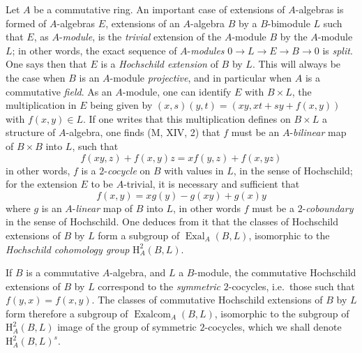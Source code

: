 \begin{env}[18.4.3]
\label{0.18.4.3}
Let $A$ be a commutative ring.
An important case of extensions of $A$-algebras is formed of $A$-algebras $E$, extensions of an $A$-algebra $B$ by a $B$-bimodule $L$ such that $E$, as $A$-\emph{module}, is the \emph{trivial} extension of the $A$-module $B$ by the $A$-module $L$; in other words, the exact sequence of $A$-\emph{modules} $0\to L\to E\to B\to 0$ is \emph{split}.
One says then that $E$ is a \emph{Hochschild extension} of $B$ by $L$.
This will always be the case when $B$ is an $A$-module \emph{projective}, and in particular when $A$ is a commutative \emph{field}.
As an $A$-module, one can identify $E$ with $B\times L$, the multiplication in $E$ being given by $(x,s)(y,t)=(xy,xt+sy+f(x,y))$ with $f(x,y)\in L$.
If one writes that this multiplication defines on $B\times L$ a structure of $A$-algebra, one finds (M, XIV, 2) that $f$ must be an $A$-\emph{bilinear} map of $B\times B$ into $L$, such that
\begin{equation}
\tag{18.4.3.1}
  \label{0.18.4.3.1}
  f(xy,z)+f(x,y)z=xf(y,z)+f(x,yz)
\end{equation}
in other words, $f$ is a $2$-\emph{cocycle} on $B$ with values in $L$, in the sense of Hochschild; for the extension $E$ to be $A$-trivial, it is necessary and sufficient that
\begin{equation}
\tag{18.4.3.2}
  \label{0.18.4.3.2}
  f(x,y)=xg(y)-g(xy)+g(x)y
\end{equation}
where $g$ is an $A$-\emph{linear} map of $B$ into $L$, in other words $f$ must be a $2$-\emph{coboundary} in the sense of Hochschild.
One deduces from it that the classes of Hochschild extensions of $B$ by $L$ form a subgroup of $\operatorname{Exal}_A(B,L)$, isomorphic to the \emph{Hochschild cohomology group} $\mathrm{H}^2_A(B,L)$.

If $B$ is a commutative $A$-algebra, and $L$ a $B$-module, the commutative Hochschild extensions of $B$ by $L$ correspond to the \emph{symmetric} $2$-cocycles, i.e.\ those such that $f(y,x)=f(x,y)$.
The classes of commutative Hochschild extensions of $B$ by $L$ form therefore a subgroup of $\operatorname{Exalcom}_A(B,L)$, isomorphic to the subgroup of $\mathrm{H}^2_A(B,L)$ image of the group of symmetric $2$-cocycles, which we shall denote $\mathrm{H}^2_A(B,L)^s$.
\end{env}

